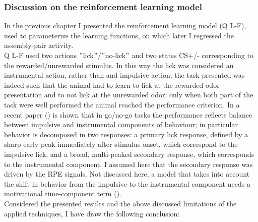 \subsubsection{Discussion on the reinforcement learning model}
In the previous chapter I presented the reinforcement learning model (Q L-F), used to parameterize the learning functions, on which later I regressed the assembly-pair activity.\\Q L-F used two actions $"$lick$"$/$"$no-lick$"$ and two states CS+/- corresponding to the rewarded/unrewarded stimulus. In this way the lick was considered an instrumental action, rather than and impulsive action; the task presented was indeed such that the animal had to learn to lick at the rewarded odor presentation and to not lick at the unrewarded odor; only when both part of the task were well performed the animal  reached the performance criterion. In a recent paper (\cite{SchultzMot}) is shown that in go/no-go tasks the performance reflects balance between impulsive and instrumental components of behaviour; in particular behavior is decomposed in two  responses: a primary lick response, defined by a sharp early peak immediately after stimulus onset, which correspond to the impulsive lick, and a broad, multi-peaked secondary response, which corresponds to the instrumental component. I assumed here that the secondary response was driven by the RPE signals. Not discussed here, a model that takes into account the shift in behavior from the impulsive to the instrumental component needs a motivational time-component term (\cite{SchultzMot}).\\Considered the presented results and the above discussed limitations of the applied techniques, I have draw the following conclusion:
